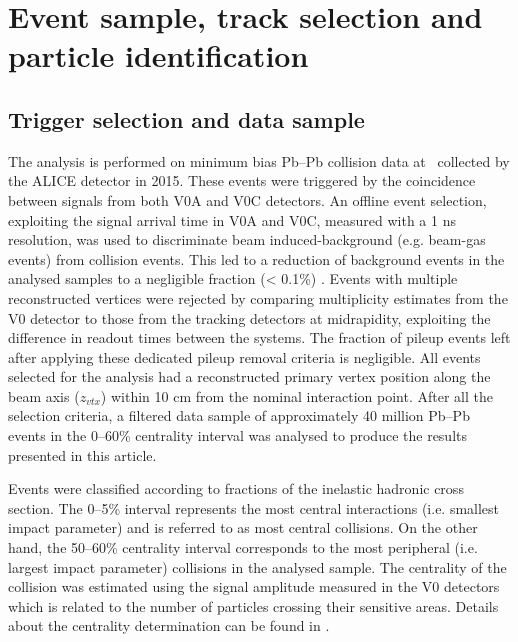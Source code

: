 \section{Event sample, track selection and particle identification}
\label{Sec:EventTrackIdentification}
\subsection{Trigger selection and data sample}
\label{SubSec:Event}
The analysis is performed on minimum bias Pb--Pb collision data at \sNN~collected by the ALICE detector in 2015. These events were triggered by the coincidence between signals from both V0A and V0C detectors. An offline event selection, exploiting the signal arrival time in V0A and V0C, measured with a 1 ns resolution, was used to discriminate beam induced-background (e.g. beam-gas events) from collision events. This led to a reduction of background events in the analysed samples to a negligible fraction (< 0.1\%) \cite{Abelev:2014ffa}. Events with multiple reconstructed vertices were rejected by comparing multiplicity estimates from the V0 detector to those from the tracking detectors at midrapidity, exploiting the difference in readout times between the systems. The fraction of pileup events left after applying these dedicated pileup removal criteria is negligible. All events selected for the analysis had a reconstructed primary vertex position along the beam axis ($z_{vtx}$) within 10 cm from the nominal interaction point. After all the selection criteria, a filtered data sample of approximately 40 million Pb--Pb events in the 0--60\% centrality interval was analysed to produce the results presented in this article.

Events were classified according to fractions of the inelastic hadronic cross section. The 0--5\% interval represents the most central interactions (i.e. smallest impact parameter) and is referred to as most central collisions. On the other hand, the 50--60\% centrality interval corresponds to the most peripheral (i.e. largest impact parameter) collisions in the analysed sample. The centrality of the collision was estimated using the signal amplitude measured in the V0 detectors which is related to the number of particles crossing their sensitive areas. Details about the centrality determination can be found in \cite{Abelev:2013qoq}.

